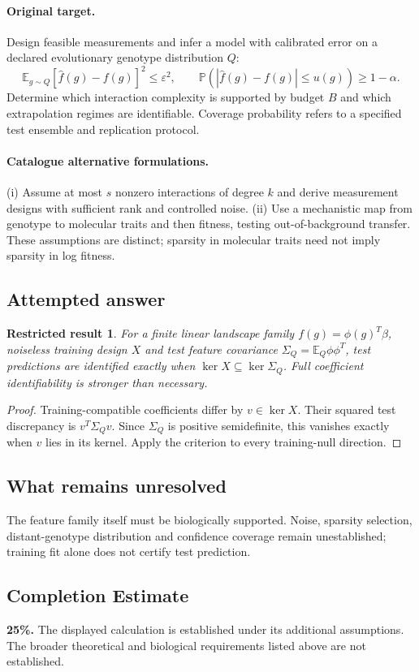 \documentclass[11pt]{article}
\newcommand{\E}{\mathbb E}
\newcommand{\Prob}{\mathbb P}
\providecommand{\E}{\mathbb E}
\providecommand{\Prob}{\mathbb P}
\newtheorem{attemptresult}{Restricted result}[section]
\begin{document}
\paragraph{Original target.}
Design feasible measurements and infer a model with calibrated error on a declared evolutionary genotype distribution $Q$:
\[
\E_{g\sim Q}[\widehat f(g)-f(g)]^2\leq\varepsilon^2,
\qquad
\Prob(|\widehat f(g)-f(g)|\leq u(g))\geq1-\alpha.
\]
Determine which interaction complexity is supported by budget $B$ and which extrapolation regimes are identifiable. Coverage probability refers to a specified test ensemble and replication protocol.
\paragraph{Catalogue alternative formulations.}
(i) Assume at most $s$ nonzero interactions of degree $k$ and derive measurement designs with sufficient rank and controlled noise. (ii) Use a mechanistic map from genotype to molecular traits and then fitness, testing out-of-background transfer. These assumptions are distinct; sparsity in molecular traits need not imply sparsity in log fitness.
\subsection{Attempted answer}
\begin{attemptresult}
For a finite linear landscape family $f(g)=\phi(g)^T\beta$, noiseless training design $X$ and test feature covariance $\Sigma_Q=\E_Q\phi\phi^T$, test predictions are identified exactly when $\ker X\subseteq\ker\Sigma_Q$. Full coefficient identifiability is stronger than necessary.
\end{attemptresult}
\begin{proof}
Training-compatible coefficients differ by $v\in\ker X$. Their squared test discrepancy is $v^T\Sigma_Qv$. Since $\Sigma_Q$ is positive semidefinite, this vanishes exactly when $v$ lies in its kernel. Apply the criterion to every training-null direction.
\end{proof}
\subsection{What remains unresolved}
The feature family itself must be biologically supported. Noise, sparsity selection, distant-genotype distribution and confidence coverage remain unestablished; training fit alone does not certify test prediction.
\subsection{Completion Estimate}
\textbf{25\%.} The displayed calculation is established under its additional assumptions. The broader theoretical and biological requirements listed above are not established.
\end{document}
